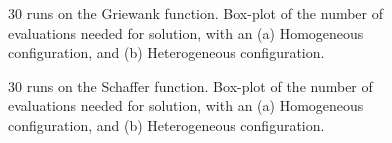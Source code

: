 \documentclass{llncs}
\begin{document}
\begin{figure}[t]
    \centering
      \caption{ 30 runs on the Griewank function. Box-plot of the number of evaluations needed for solution, 
                 with an (a) Homogeneous configuration, and (b) Heterogeneous configuration.}
    \label{fig:griewank-evals}
\end{figure}

\begin{figure}[t]
    \centering
 

    \caption{30 runs on the Schaffer function. Box-plot of the number of evaluations needed for 
      solution, with an (a) Homogeneous configuration, and (b) Heterogeneous configuration.}
    \label{fig:schaffer}
\end{figure}
\end{document}
